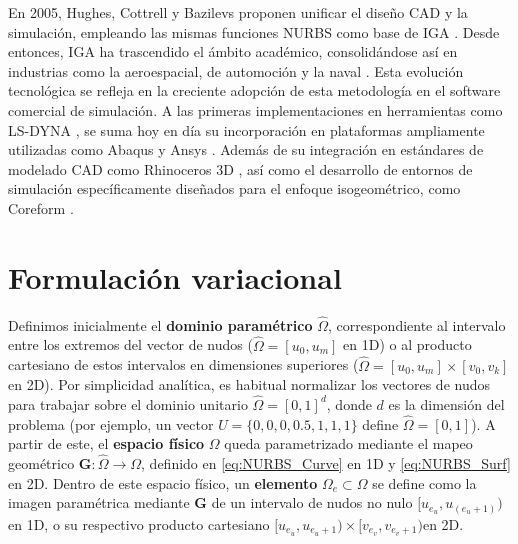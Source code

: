 \documentclass[11pt]{book}
\theoremstyle{plain} %
\theoremstyle{definition} %
\theoremstyle{definition} %
\begin{document}
En 2005, Hughes, Cottrell y Bazilevs proponen unificar el diseño CAD y la simulación, empleando
las mismas funciones NURBS como base de IGA \cite{hughes_isogeometric_2005}. Desde entonces,
IGA ha trascendido el ámbito académico, consolidándose así en industrias como la aeroespacial,
de automoción y la naval \cite{cottrell_isogeometric_2009}. Esta evolución tecnológica se refleja
en la creciente adopción de esta metodología en el software comercial de simulación.
A las primeras implementaciones en herramientas como LS-DYNA \cite{benson_large_2011},
se suma hoy en día su incorporación en plataformas ampliamente utilizadas como Abaqus
\cite{dassault_systemes_abaqus_2016} y Ansys \cite{ansys_inc_ansys_2024}. Además de su integración en 
estándares de modelado CAD como Rhinoceros 3D \cite{robert_mcneel__associates_rhinoceros_2024}, así como el desarrollo de entornos de
simulación específicamente diseñados para el enfoque isogeométrico, como Coreform
\cite{coreform_llc_coreform_2025}.

\vspace{-0.55cm}



\section{Formulación variacional}


\vspace{-0.2cm}



Definimos inicialmente el \textbf{dominio paramétrico} $\hat{\Omega}$, correspondiente al intervalo
entre los extremos del vector de nudos ($\hat{\Omega} = [u_0, u_m]$ en 1D) o al producto cartesiano de estos intervalos en dimensiones superiores ($\hat{\Omega} = [u_0, u_m] \times [v_0, v_k]$ en 2D).
Por simplicidad analítica, es habitual normalizar los vectores de nudos para trabajar sobre el dominio unitario $\hat{\Omega} = [0,1]^d$, donde $d$ es la dimensión
del problema (por ejemplo, un vector $U=\{0,0,0, 0.5, 1,1,1\}$ define $\hat{\Omega} = [0, 1]$).
A partir de este, el \textbf{espacio físico} $\Omega$ queda parametrizado mediante el mapeo geométrico
$\mathbf{G}: \hat{\Omega} \to \Omega$, definido en \eqref{eq:NURBS_Curve} en 1D y \eqref{eq:NURBS_Surf} en 2D.
Dentro de este espacio físico, un \textbf{elemento} $\Omega_e \subset \Omega$ se define como la imagen paramétrica
mediante $\mathbf{G}$ de un intervalo de nudos no nulo $[u_{e_u}, u_{(e_u+1)})$ en 1D, o su respectivo producto
cartesiano $[u_{e_u}, u_{e_u+1})\times [v_{e_v}, v_{e_v+1})$en 2D.
\end{document}
